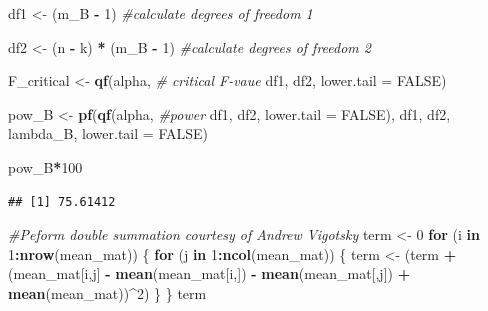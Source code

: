 \documentclass[]{book}
\newenvironment{Shaded}{\begin{snugshade}}{\end{snugshade}}
\newcommand{\CommentTok}[1]{\textcolor[rgb]{0.56,0.35,0.01}{\textit{#1}}}
\newcommand{\ControlFlowTok}[1]{\textcolor[rgb]{0.13,0.29,0.53}{\textbf{#1}}}
\newcommand{\DataTypeTok}[1]{\textcolor[rgb]{0.13,0.29,0.53}{#1}}
\newcommand{\DecValTok}[1]{\textcolor[rgb]{0.00,0.00,0.81}{#1}}
\newcommand{\KeywordTok}[1]{\textcolor[rgb]{0.13,0.29,0.53}{\textbf{#1}}}
\newcommand{\NormalTok}[1]{#1}
\newcommand{\OperatorTok}[1]{\textcolor[rgb]{0.81,0.36,0.00}{\textbf{#1}}}
\newcommand{\OtherTok}[1]{\textcolor[rgb]{0.56,0.35,0.01}{#1}}
\newcommand{\StringTok}[1]{\textcolor[rgb]{0.31,0.60,0.02}{#1}}
\begin{document}
\begin{Shaded}
\begin{Highlighting}[]
\NormalTok{df1 <-}\StringTok{ }\NormalTok{(m_B }\OperatorTok{-}\StringTok{ }\DecValTok{1}\NormalTok{) }\CommentTok{#calculate degrees of freedom 1}

\NormalTok{df2 <-}\StringTok{ }\NormalTok{(n }\OperatorTok{-}\StringTok{ }\NormalTok{k) }\OperatorTok{*}\StringTok{ }\NormalTok{(m_B }\OperatorTok{-}\StringTok{ }\DecValTok{1}\NormalTok{) }\CommentTok{#calculate degrees of freedom 2}

\NormalTok{F_critical <-}\StringTok{ }\KeywordTok{qf}\NormalTok{(alpha, }\CommentTok{# critical F-vaue}
\NormalTok{                 df1,}
\NormalTok{                 df2,}
                 \DataTypeTok{lower.tail =} \OtherTok{FALSE}\NormalTok{) }

\NormalTok{pow_B <-}\StringTok{ }\KeywordTok{pf}\NormalTok{(}\KeywordTok{qf}\NormalTok{(alpha, }\CommentTok{#power }
\NormalTok{             df1, }
\NormalTok{             df2, }
             \DataTypeTok{lower.tail =} \OtherTok{FALSE}\NormalTok{), }
\NormalTok{          df1, }
\NormalTok{          df2, }
\NormalTok{          lambda_B, }
          \DataTypeTok{lower.tail =} \OtherTok{FALSE}\NormalTok{)}


\NormalTok{pow_B}\OperatorTok{*}\DecValTok{100}
\end{Highlighting}
\end{Shaded}

\begin{verbatim}
## [1] 75.61412
\end{verbatim}

\begin{Shaded}
\begin{Highlighting}[]
\CommentTok{#Peform double summation courtesy of Andrew Vigotsky}
\NormalTok{term <-}\StringTok{ }\DecValTok{0}
\ControlFlowTok{for}\NormalTok{ (i }\ControlFlowTok{in} \DecValTok{1}\OperatorTok{:}\KeywordTok{nrow}\NormalTok{(mean_mat)) \{}
  \ControlFlowTok{for}\NormalTok{ (j }\ControlFlowTok{in} \DecValTok{1}\OperatorTok{:}\KeywordTok{ncol}\NormalTok{(mean_mat)) \{}
\NormalTok{    term <-}\StringTok{ }\NormalTok{(term }\OperatorTok{+}\StringTok{ }\NormalTok{(mean_mat[i,j] }\OperatorTok{-}\StringTok{ }
\StringTok{                       }\KeywordTok{mean}\NormalTok{(mean_mat[i,]) }\OperatorTok{-}\StringTok{ }
\StringTok{                       }\KeywordTok{mean}\NormalTok{(mean_mat[,j]) }\OperatorTok{+}\StringTok{ }\KeywordTok{mean}\NormalTok{(mean_mat))}\OperatorTok{^}\DecValTok{2}\NormalTok{)}
\NormalTok{  \}}
\NormalTok{\}}
\NormalTok{term}
\end{Highlighting}
\end{Shaded}
\end{document}
